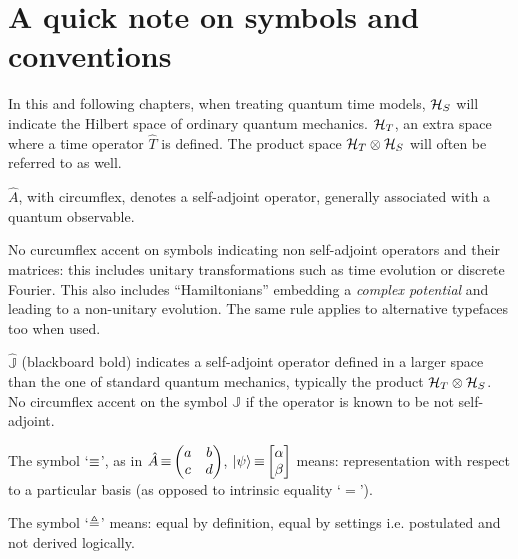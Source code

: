 \small

\section*{A quick note on symbols and conventions}

In this and following chapters, when treating quantum time models,
$\mathcal{H}_S$ will indicate the Hilbert space of ordinary quantum mechanics.
$\mathcal{H}_T$, an extra space where a time operator $\hat{T}$ is defined. The product space $\mathcal{H}_T \otimes \mathcal{H}_S$
will often be referred to as well.

$\hat{A}$, with circumflex, denotes a self-adjoint operator, generally associated with a quantum observable.

No curcumflex accent on symbols indicating non self-adjoint operators and their matrices:
this includes unitary transformations such as
time evolution or discrete Fourier.
This also includes ``Hamiltonians'' embedding a \emph{complex potential}
and leading to a non-unitary evolution. The same rule applies to alternative typefaces too when used.

$\hat{\mathbb{J}}$ (blackboard bold) indicates a self-adjoint operator defined in
a larger space than the one of standard quantum mechanics,
typically the product $\mathcal{H}_T \otimes \mathcal{H}_S$.
No circumflex accent on the symbol ${\mathbb{J}}$ if the operator is
known to be not self-adjoint.

The symbol `$\operatorname*{\equiv}$', as in $\hat{A} \repr \mqty(a&b\\c&d)$, $\ket{\psi} \repr \mqty[\alpha \\ \beta]$
means: representation with respect to a particular basis (as opposed to intrinsic equality `$=$').

The symbol `$\triangleq$'
means: equal by definition, equal by settings i.e. postulated and not derived logically.

\normalsize